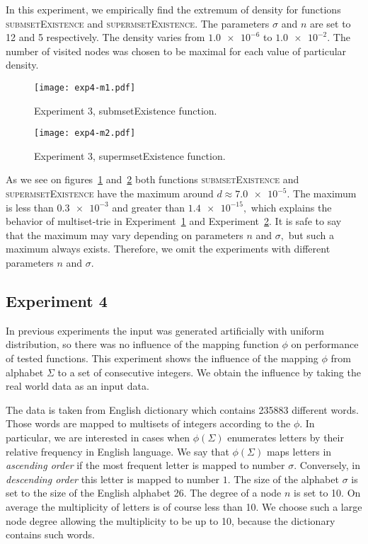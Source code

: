 In this experiment, we empirically find the extremum of density for functions 
\textsc{submsetExistence} and \textsc{supermsetExistence}. The parameters 
$\sigma$ and $n$ are set to 12 and 5 respectively. The density varies from 
$\num{1.0e-6}$ to $\num{1.0e-2}.$ The number of visited nodes was chosen to be 
maximal for each value of particular density.

\begin{figure}
\center
\texttt{[image: exp4-m1.pdf]}
\caption{Experiment 3, submsetExistence function.}
\label{fig:e3m1}
\end{figure}

\begin{figure}
\center
\texttt{[image: exp4-m2.pdf]}
\caption{Experiment 3, supermsetExistence function.}
\label{fig:e3m2}
\end{figure}

As we see on figures~\ref{fig:e3m1} and~\ref{fig:e3m2} both functions 
\textsc{submsetExistence} and \textsc{supermsetExistence} have the maximum 
around $d\approx \num{7.0e-5}.$ The maximum is less than $\num{0.3e-3}$ and 
greater than $\num{1.4e-15},$ which explains the behavior of multiset-trie in 
Experiment~\hyperref[s:exp1]{1} and Experiment~\hyperref[s:exp2]{2}. It is safe 
to say that the maximum may vary depending on parameters $n$ and $\sigma,$ but 
such a maximum always exists. Therefore, we omit the experiments with different 
parameters $n$ and $\sigma.$


\subsection{Experiment 4} \label{s:exp4}
In previous experiments the input was generated artificially with uniform 
distribution, so there was no influence of the mapping function $\phi$ on 
performance of tested functions. This experiment shows the influence of the 
mapping $\phi$ from alphabet $\Sigma$ to a set of consecutive integers. 
We obtain the influence by taking the real world data as an input data. 

The data is taken from English dictionary which contains 235883 different words. 
Those words are mapped to multisets of integers according to the $\phi.$ In 
particular, we are interested in cases when $\phi(\Sigma)$ enumerates 
letters by their relative frequency in English language. We say that $\phi(\Sigma)$ 
maps letters in \emph{ascending order} if the most frequent letter is mapped to 
number $\sigma.$ Conversely, in \emph{descending order} this letter is mapped to 
number $1.$ The size of the alphabet $\sigma$ is set to the size of the English 
alphabet 26. The degree of a node $n$ is set to 10. On average the multiplicity 
of letters is of course less than 10. We choose such a large node degree allowing 
the multiplicity to be up to 10, because the dictionary contains such words. 


